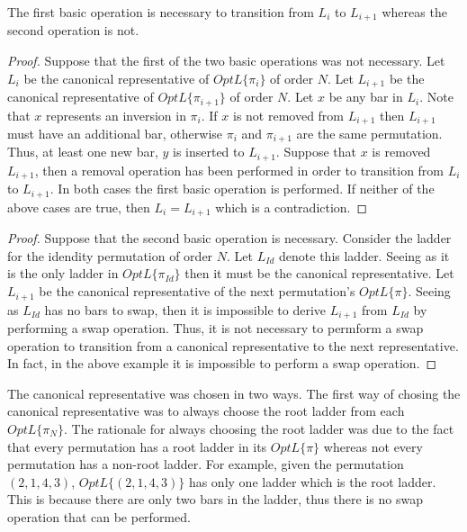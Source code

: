 \begin{theorem} The first basic operation 
is necessary to transition from $L_{i}$ to $L_{i+1}$ whereas the second operation is not.
\end{theorem}

\begin{proof}
    Suppose that the first of the two basic operations was not necessary.
    Let $L_{i}$ be the canonical representative of $OptL\{\pi_{i}\}$ of 
    order $N$. Let $L_{i+1}$ be the canonical representative of $OptL\{\pi_{i+1}\}$
    of order $N$. Let $x$ be any bar in $L_{i}$. Note that $x$ represents an 
    inversion in $\pi_{i}$. If $x$ is not removed from $L_{i+1}$ then $L_{i+1}$ 
    must have an additional bar, otherwise $\pi_{i}$ and $\pi_{i+1}$ are the same permutation.
    Thus, at least one new bar, $y$ is inserted to $L_{i+1}$. Suppose that $x$ is removed $L_{i+1}$,
    then a removal operation has been performed in order to transition from $L_{i}$ 
    to $L_{i+1}$. In both cases the first basic operation is performed. If neither of the above 
    cases are true, then $L_{i}=L_{i+1}$ which is a contradiction.
\end{proof}
\begin{proof}
    Suppose that the second basic operation is necessary. Consider the ladder 
    for the idendity permutation of order $N$. Let $L_{Id}$ denote this ladder. 
    Seeing as it is the only ladder in $OptL\{\pi_{Id}\}$ then it must be the 
    canonical representative. Let $L_{i+1}$ be the canonical representative of 
    the next permutation's $OptL\{\pi\}$. Seeing as $L_{Id}$ has no bars to swap, 
   then it is impossible to derive $L_{i+1}$ from $L_{Id}$ by performing a 
   swap operation. Thus, it is not necessary to permform a swap operation to transition 
   from a canonical representative to the next representative. In fact, in the above example 
   it is impossible to perform a swap operation. 
\end{proof}
The canonical representative was chosen in two ways. The first way of 
chosing the canonical representative was to always choose the root ladder from each $OptL\{\pi_{N}\}$.
The rationale for always choosing the root ladder was due to the fact that every 
permutation has a root ladder in its $OptL\{\pi\}$ whereas not every permutation 
has a non-root ladder. For example, given the permutation $(2,1,4,3)$, $OptL\{(2,1,4,3)\}$
has only one ladder which is the root ladder. This is because there are only two 
bars in the ladder, thus there is no swap operation that can be performed.
